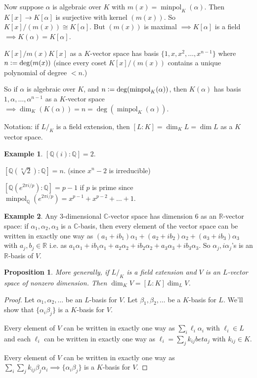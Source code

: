 \documentclass{article}
\newcommand{\R}{\mathbb{R}}
\newcommand{\C}{\mathbb{C}}
\newcommand{\Q}{\mathbb{Q}}
\newcommand{\defeq}{\vcentcolon=}
\newtheorem*{proposition}{Proposition}
\theoremstyle{definition}
\newtheorem*{example}{Example}
\theoremstyle{remark}
\begin{document}
Now suppose $\alpha$ is algebraic over $K$ with $m(x) = \operatorname{minpol}_K(\alpha)$. Then $K[x] \to K[\alpha]$ is surjective with kernel $(m(x))$. So $K[x]/(m(x)) \cong K[\alpha]$. But $(m(x))$ is maximal $\implies K[\alpha]$ is a field $\implies K(\alpha) = K[\alpha]$.

$K[x]/m(x)K[x]$ as a $K$-vector space has basis $\{1, x, x^2, \ldots, x^{n-1}\}$ where $n \defeq \deg(m(x))$ (since every coset $K[x]/(m(x))$ contains a unique polynomial of degree $< n$.)

So if $\alpha$ is algebraic over $K$, and $n \defeq \deg(\operatorname{minpol}_K(\alpha))$, then $K(\alpha)$ has basis $1, \alpha, \ldots, \alpha^{n-1}$ as a $K$-vector space $\implies \dim_K(K(\alpha)) = n = \deg(\operatorname{minpol}_K(\alpha))$.

Notation: if $L/_K$ is a field extension, then $[L:K] = \dim_K L = \dim L$ as a $K$ vector space.

\begin{example}
  $[\Q(i): \Q] = 2$. 
  
  $[\Q(\sqrt[n]{2}): \Q] = n$. (since $x^n - 2$ is irreducible)

  $[\Q(e^{2\pi i/p}): \Q] = p - 1$ if $p$ is prime since $\operatorname{minpol}_\Q(e^{2\pi i/p}) = x^{p-1} + x^{p-2} + \ldots + 1$.
\end{example}

\begin{example}
  Any $3$-dimensional $\C$-vector space has dimension $6$ as an $\R$-vector space: if $\alpha_1, \alpha_2, \alpha_3$ is a $\C$-basis, then every element of the vector space can be written in exactly one way as $(a_1 + ib_1)\alpha_1 + (a_2 + ib_2)\alpha_2 + (a_3 + ib_3)\alpha_3$ with $a_j, b_j \in \R$ i.e. as $a_1\alpha_1 + ib_1\alpha_1 + a_2\alpha_2 + ib_2\alpha_2 + a_3\alpha_3 + ib_3\alpha_3$. So $\alpha_j, i\alpha_j$'s is an $\R$-basis of $V$.
\end{example}

\begin{proposition}
  More generally, if $L/_K$ is a field extension and $V$ is an $L$-vector space of nonzero dimension. Then $\dim_K V = [L: K] \dim_L V$.
\end{proposition}
\begin{proof}
  Let $\alpha_1, \alpha_2, \ldots$ be an $L$-basis for $V$. Let $\beta_1, \beta_2, \ldots$ be a $K$-basis for $L$. We'll show that $\{\alpha_i\beta_j\}$ is a $K$-basis for $V$.

  Every element of $V$ can be written in exactly one way as $\sum_i \ell_i\alpha_i$ with $\ell_i \in L$ and each $\ell_i$ can be written in exactly one way as $\ell_i = \sum_j k_{ij} beta_j$ with $k_{ij} \in K$.

  Every element of $V$ can be written in exactly one way as $\sum_i\sum_j k_{ij} \beta_j \alpha_i \implies \{\alpha_i\beta_j\}$ is a $K$-basis for $V$.
\end{proof}
\end{document}
